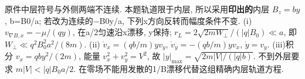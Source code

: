 \begin{solution}
原件中层符号与外侧两端不连续. 本题轨道限于内层, 所以采用\textbf{印出的}内层 $B_z=by$, b=B0/a; 若改为连续的\ensuremath{-}B0y/a, 下列x方向反转而幅度条件不变. (i) $v_{\nabla B,x}=-\mu/(qy)$, 在a/2匀速沿x漂移, y保持; $r_L=2\sqrt{2mW_\perp}/(|q|B_0)\ll a$, 即 $W_\perp\ll q^2B_0^2a^2/(8m)$. (ii) $\dot v_x=(qb/m)yv_y$, $\dot v_y=-(qb/m)yv_x$, $\dot y=v_y$. (iii)积分 $v_x=qby^2/(2m)$, 能量 $v_x^2+v_y^2=V^2$, 故 $|y|_{\max}=\sqrt{2m|V|/(|q|b)}$. 不到外层要求 $m|V|<|q|B_0a/2$. 在零场不能用发散的1/B漂移代替这组精确内层轨道方程.
\end{solution}
